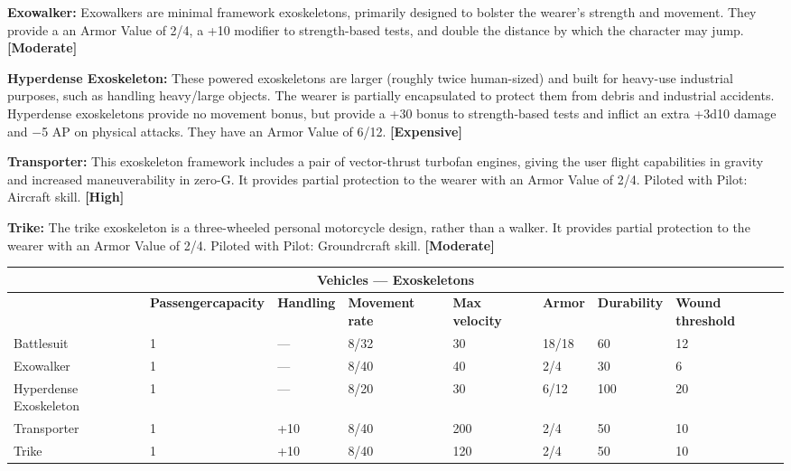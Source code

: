 \textbf{Exowalker:} Exowalkers are minimal framework exoskeletons, primarily designed to bolster the wearer’s strength and movement. They provide a an Armor Value of 2/4, a +10 modifier to strength-based tests, and double the distance by which the character may jump. \textbf{[Moderate]} 

\textbf{Hyperdense Exoskeleton:} These powered exoskeletons are larger (roughly twice human-sized) and built for heavy-use industrial purposes, such as handling heavy/large objects. The wearer is partially encapsulated to protect them from debris and industrial accidents. Hyperdense exoskeletons provide no movement bonus, but provide a +30 bonus to strength-based tests and inflict an extra +3d10 damage and $-$5 AP on physical attacks. They have an Armor Value of 6/12. \textbf{[Expensive]} 

\textbf{Transporter:} This exoskeleton framework includes a pair of vector-thrust turbofan engines, giving the user flight capabilities in gravity and increased maneuverability in zero-G. It provides partial protection to the wearer with an Armor Value of 2/4. Piloted with Pilot: Aircraft skill. \textbf{[High]} 

\textbf{Trike:} The trike exoskeleton is a three-wheeled personal motorcycle design, rather than a walker. It provides partial protection to the wearer with an Armor Value of 2/4. Piloted with Pilot: Groundrcraft skill. \textbf{[Moderate]} 



\begin{table} \begin{tabularx}{\textwidth}{|X|X|X|X|X|X|X|X|} \hline

\multicolumn{8}{|c|}{\textbf{Vehicles --- Exoskeletons}} \\ \hline

&\textbf{Passenger\newline capacity}	&\textbf{Handling}	&\textbf{Movement rate}	&\textbf{Max velocity}	&\textbf{Armor}	&\textbf{Durability}	&\textbf{Wound threshold} \\ \hline

Battlesuit	&1	&--- &8/32	&30	&18/18	&60	&12 \\ \hline

Exowalker	&1	&--- &8/40	&40	&2/4	&30	&6 \\ \hline

Hyperdense Exoskeleton	&1	&--- &8/20	&30	&6/12	&100	&20 \\ \hline

Transporter	&1	&+10	&8/40	&200	&2/4	&50	&10 \\ \hline

Trike	&1	&+10	&8/40	&120	&2/4	&50	&10 \\ \hline

\end{tabularx} \label{tab:exoskeletons} \end{table} 









